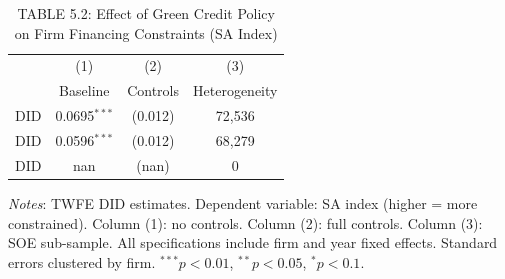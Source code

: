 \begin{table}[htbp]
\caption{TABLE 5.2: Effect of Green Credit Policy on Firm Financing Constraints (SA Index)}
\label{tab:cs2-gc}
\centering

\begin{threeparttable}
\begin{tabular}{lccc}
\toprule
                               & \multicolumn{1}{c}{(1)} & \multicolumn{1}{c}{(2)} & \multicolumn{1}{c}{(3)} \\
                               & \multicolumn{1}{c}{Baseline} & \multicolumn{1}{c}{Controls} & \multicolumn{1}{c}{Heterogeneity} \\
\midrule
  DID & 0.0695$^{***}$ & (0.012) & 72,536 \\
  DID & 0.0596$^{***}$ & (0.012) & 68,279 \\
  DID & nan & (nan) & 0 \\
\midrule
\bottomrule
\end{tabular}
\begin{tablenotes}
\item \textit{Notes}: TWFE DID estimates. Dependent variable: SA index (higher = more constrained). Column (1): no controls. Column (2): full controls. Column (3): SOE sub-sample. All specifications include firm and year fixed effects. Standard errors clustered by firm. $^{***}p<0.01$, $^{**}p<0.05$, $^{*}p<0.1$.
\end{tablenotes}
\end{threeparttable}
\end{table}
